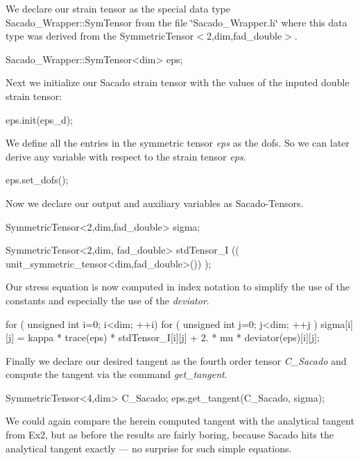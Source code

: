 We declare our strain tensor as the special data type Sacado\+\_\+\+Wrapper\+::\+Sym\+Tensor from the file \char`\"{}\+Sacado\+\_\+\+Wrapper.\+h\char`\"{} where this data type was derived from the Symmetric\+Tensor$<$2,dim,fad\+\_\+double$>$. 
\begin{DoxyCode}
Sacado\_Wrapper::SymTensor<dim> eps;
\end{DoxyCode}
 Next we initialize our Sacado strain tensor with the values of the inputed double strain tensor\+: 
\begin{DoxyCode}
eps.init(eps\_d);
\end{DoxyCode}
 We define all the entries in the symmetric tensor {\itshape eps} as the dofs. So we can later derive any variable with respect to the strain tensor {\itshape eps}. 
\begin{DoxyCode}
eps.set\_dofs();
\end{DoxyCode}
 Now we declare our output and auxiliary variables as Sacado-\/\+Tensors. 
\begin{DoxyCode}
SymmetricTensor<2,dim,fad\_double> sigma;

SymmetricTensor<2,dim, fad\_double> stdTensor\_I (( unit\_symmetric\_tensor<dim,fad\_double>()) );
\end{DoxyCode}
 Our stress equation is now computed in index notation to simplify the use of the constants and especially the use of the {\itshape deviator}. 
\begin{DoxyCode}
\textcolor{keywordflow}{for} ( \textcolor{keywordtype}{unsigned} \textcolor{keywordtype}{int} i=0; i<dim; ++i)
  \textcolor{keywordflow}{for} ( \textcolor{keywordtype}{unsigned} \textcolor{keywordtype}{int} j=0; j<dim; ++j )
      sigma[i][j] = kappa * trace(eps) *  stdTensor\_I[i][j] + 2. * mu * deviator(eps)[i][j];
\end{DoxyCode}
 Finally we declare our desired tangent as the fourth order tensor {\itshape C\+\_\+\+Sacado} and compute the tangent via the command {\itshape get\+\_\+tangent}. 
\begin{DoxyCode}
SymmetricTensor<4,dim> C\_Sacado;
eps.get\_tangent(C\_Sacado, sigma);
\end{DoxyCode}
 We could again compare the herein computed tangent with the analytical tangent from Ex2, but as before the results are fairly boring, because Sacado hits the analytical tangent exactly --- no surprise for such simple equations.

